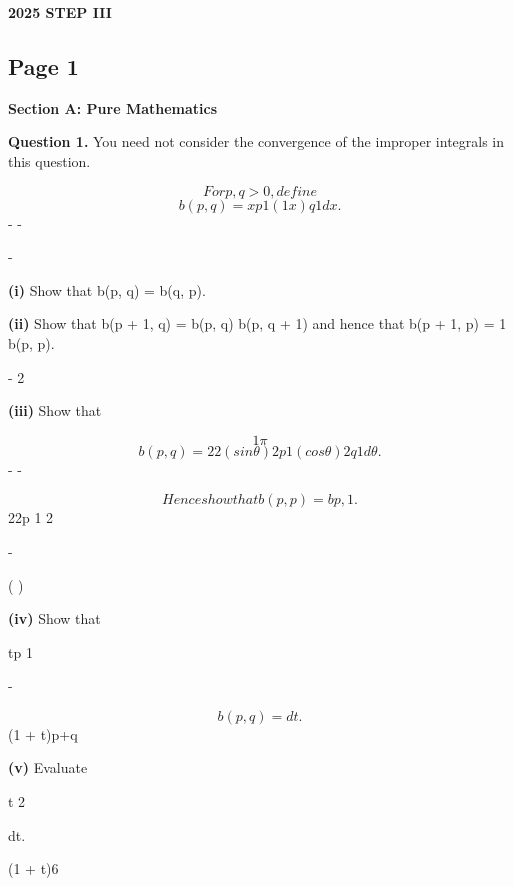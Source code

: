 \documentclass[12pt]{article}
\begin{document}
\begin{center}
{\Large \textbf{2025 STEP III}}
\end{center}

\subsection*{Page 1}
\begin{flushleft}
\bigskip\textbf{Section A: Pure Mathematics}\par
\bigskip\textbf{Question 1.} You need not consider the convergence of the improper integrals in this question.\par
\[For p, q > 0, define\]
\[b(p, q) = xp 1(1 x)q 1 dx.\]
- -\par
-\par
\textbf{(i)} Show that b(p, q) = b(q, p).\par
\textbf{(ii)} Show that b(p + 1, q) = b(p, q) b(p, q + 1) and hence that b(p + 1, p) = 1 b(p, p).\par
- 2\par
\textbf{(iii)} Show that\par
\[1 \pi\]
\[b(p, q) = 2 2 (sin θ)2p 1(cos θ)2q 1 dθ.\]
- -\par
\[Hence show that b(p, p) = b p, 1 .\]
22p 1 2\par
-\par
( )\par
\textbf{(iv)} Show that\par
tp 1\par
\infty -\par
\[b(p, q) = dt.\]
(1 + t)p+q\par
\textbf{(v)} Evaluate\par
\infty t 2\par
dt.\par
(1 + t)6\par
\end{flushleft}
\end{document}
